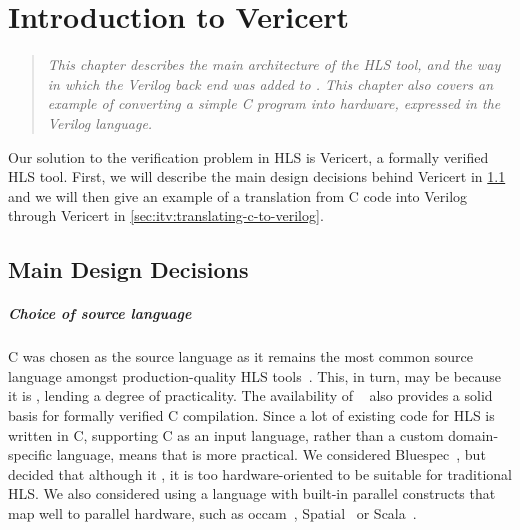 \chapter{Introduction to Vericert}%
\label{sec:introduction-to-vericert}

\begin{quote}\itshape
  This chapter describes the main architecture of the HLS tool, and the way in
  which the Verilog back end was added to \compcert{}.  This chapter also covers
  an example of converting a simple C program into hardware, expressed in the
  Verilog language.
\end{quote}

\noindent Our solution to the verification problem in \gls{HLS} is Vericert, a
formally verified \gls{HLS} tool.  First, we will describe the main design
decisions behind Vericert in \cref{sec:itv:main-design-decisions} and we will
then give an example of a translation from C code into Verilog through Vericert
in \cref{sec:itv:translating-c-to-verilog}.

\section{Main Design Decisions}%
\label{sec:itv:main-design-decisions}

\paragraph{Choice of source language}

C was chosen as the source language as it remains the most common source
language amongst production-quality HLS tools~\cite{canis13_l,
  amd23_vitis_high_synth, intel20_hsc, pilato13_bambu}. This, in turn, may be
because it is , lending a
degree of practicality.  The availability of
\compcert{}~\cite{leroy09_formal_verif_realis_compil} also provides a solid
basis for formally verified C compilation.  Since a lot of existing code for HLS
is written in C, supporting C as an input language, rather than a custom
domain-specific language, means that \vericert{} is more practical.  We
considered Bluespec~\cite{nikhil04_bsv}, but decided that although it
, it is too hardware-oriented to be suitable for traditional HLS.  We
also considered using a language with built-in parallel constructs that map well
to parallel hardware, such as occam~\cite{page91_compil_occam},
Spatial~\cite{koeplinger18_s} or Scala~\cite{bachrach12_chisel}.

